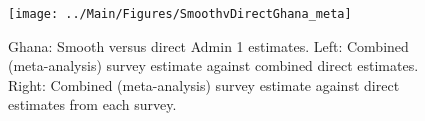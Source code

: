 \documentclass[12pt]{article}\usepackage[]{graphicx}\usepackage[]{color}
\newenvironment{knitrout}{}{} %
\begin{document}

\begin{knitrout}
\color{fgcolor}\begin{figure}[bht]

{\centering \texttt{[image: ../Main/Figures/SmoothvDirectGhana\_meta]} 

}

\caption[Ghana]{Ghana: Smooth versus direct Admin 1 estimates. Left: Combined (meta-analysis) survey estimate against combined direct estimates. Right: Combined (meta-analysis) survey estimate against direct estimates from each survey.}\label{fig:unnamed-chunk-143}
\end{figure}


\end{knitrout}
\end{document}
